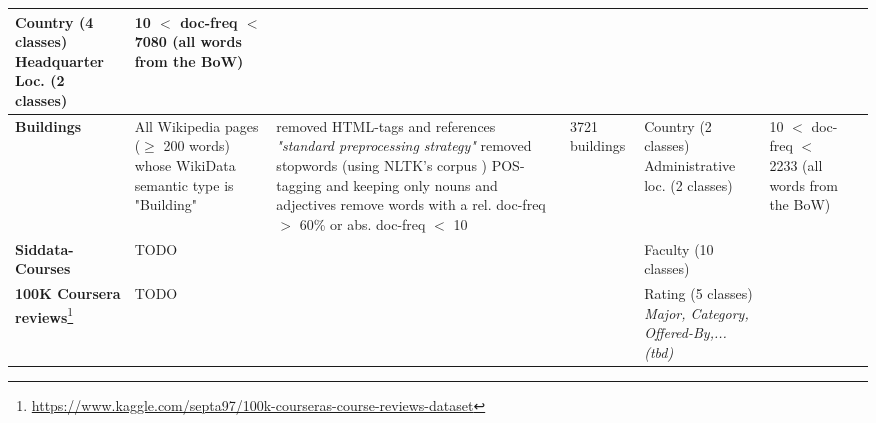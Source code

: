 {\begin{landscape}
\begin{table}[]
{\begin{tabular}{@{}lllllll@{}}
					\specialcell[l]{ \tabitem Country (4 classes)\\ \tabitem Headquarter Loc. (2 classes)} &
					\specialcell[l]{ 10 $<$ doc-freq $<$ 7080 \\ (all words from the BoW)} \\ \midrule
				\textbf{Buildings\footnoteref{fnote:for_alshaikh2019} \cite{Alshaikh2020}} &
					\specialcell[l]{All Wikipedia pages ($\geq$ 200 words) whose \\ WikiData semantic type is "Building"} &
					\specialcell[l]{ \tabitem removed HTML-tags and references \\ \tabitem \textit{"standard preprocessing strategy"} \cite[137]{Alshaikh2019} \\ \tabitem removed stopwords (using NLTK's corpus \cite{loper-bird-2002-nltk})\\ \tabitem POS-tagging and keeping only nouns and adjectives \\ \tabitem remove words with a rel. doc-freq  $>$ 60\% or abs. doc-freq $<$ 10 } &
					3721 buildings &
					\specialcell[l]{ \tabitem Country (2 classes)\\ \tabitem Administrative loc. (2 classes)} &
					\specialcell[l]{10 $<$ doc-freq $<$ 2233 \\ (all words from the BoW) }\\ \midrule \midrule
				\textbf{Siddata-Courses} &
					TODO &
					&
					&
					\tabitem Faculty (10 classes) 
					\\ \midrule 
				\textbf{100K Coursera reviews}\footnote{\url{https://www.kaggle.com/septa97/100k-courseras-course-reviews-dataset}} &
					TODO &
					&
					&
					\specialcell[l]{ \tabitem Rating (5 classes) \\ \textit{\tabitem Major, Category, Offered-By,... (tbd)} }
					\\ 
			\end{tabular}
			\label{tab:all_datasets}
		}
	\end{table}
\end{landscape}	


\restoregeometry
} %